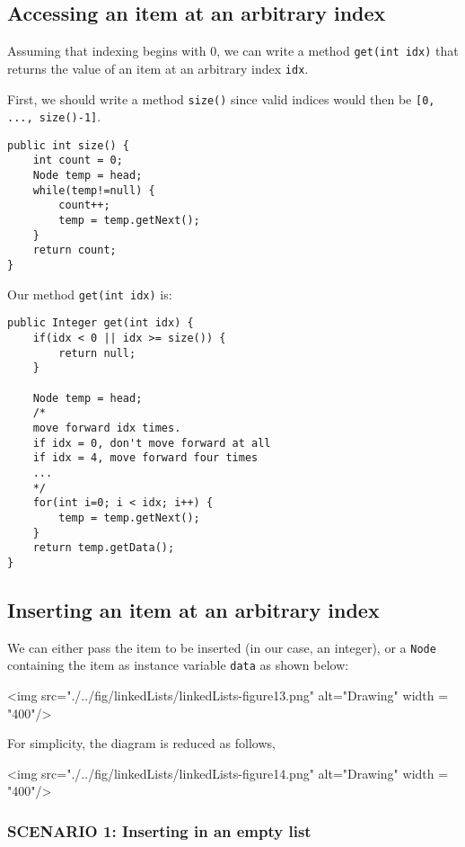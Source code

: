 \newpage

\subsection{Accessing an item at an arbitrary index}

Assuming that indexing begins with 0, we can write a method \texttt{get(int idx)} that returns the value of an item at an arbitrary index \texttt{idx}.

First, we should write a method \texttt{size()} since valid indices would then be \texttt{[0, ..., size()-1]}.

\begin{lstlisting}
public int size() {
	int count = 0;
	Node temp = head;
	while(temp!=null) {
		count++;
		temp = temp.getNext();
	}
	return count;
}
\end{lstlisting}

Our method \texttt{get(int idx)} is:

\begin{lstlisting}
public Integer get(int idx) {
	if(idx < 0 || idx >= size()) {
		return null;
	}
	
	Node temp = head;
	/*
	move forward idx times. 
	if idx = 0, don't move forward at all
	if idx = 4, move forward four times
	...
	*/
	for(int i=0; i < idx; i++) {
		temp = temp.getNext();
	}
	return temp.getData();
}
\end{lstlisting}

\subsection{Inserting an item at an arbitrary index}

We can either pass the item to be inserted (in our case, an integer), or a \texttt{Node} containing the item as instance variable \texttt{data} as shown below:

\vskip 0.5cm

<img src="./../fig/linkedLists/linkedLists-figure13.png" alt="Drawing" width = "400"/>

\vskip 0.5cm

For simplicity, the diagram is reduced as follows,

\vskip 0.5cm

<img src="./../fig/linkedLists/linkedLists-figure14.png" alt="Drawing" width = "400"/>
 
\subsubsection{SCENARIO 1: Inserting in an empty list}

